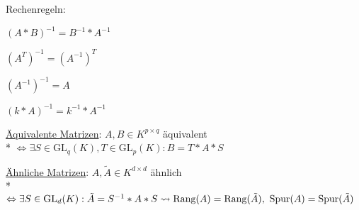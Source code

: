 \begin{items}
    \item Rechenregeln:
    \begin{enumeration}
      \item $(A*B)^{-1}=B^{-1}*A^{-1}$
      \item $(A^T)^{-1}=(A^{-1})^T$
      \item $(A^{-1})^{-1}=A$
      \item $(k*A)^{-1} = k^{-1}*A^{-1}$
    \end{enumeration}
    \item \underline{Äquivalente Matrizen}: $A,B \in K^{p \times q}$ äquivalent \\* $\Leftrightarrow \exists S \in \text{GL}_q(K), T \in \text{GL}_p(K): B=T*A*S$
    \item \underline{Ähnliche Matrizen}: $A,\tilde{A} \in K^{d \times d}$ ähnlich \\* $\Leftrightarrow \exists S \in \text{GL}_d(K): \tilde{A}=S^{-1}*A*S \\* \leadsto \text{Rang}(A)=\text{Rang}(\tilde{A}), \ \text{Spur}(A)=\text{Spur}(\tilde{A})$
  \end{items}